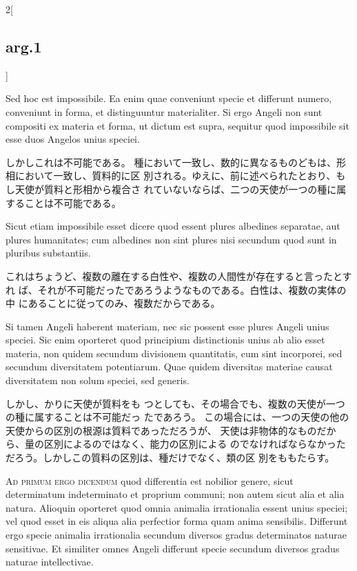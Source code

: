 \documentclass[paper=a4paper,fontsize=10pt,jafontsize=9pt,titlepage]{jlreq}
\begin{document}
\begin{paracol}{2}[\subsection{arg.1}]
\switchcolumn*

Sed hoc est
impossibile. 
Ea enim quae conveniunt specie et differunt numero,
conveniunt in forma, et distinguuntur materialiter. Si ergo Angeli non
sunt compositi ex materia et forma, ut dictum est supra, sequitur quod
impossibile sit esse duos Angelos unius speciei.

\switchcolumn

しかしこれは不可能である。
種において一致し、数的に異なるものどもは、形相において一致し、質料的に区
 別される。ゆえに、前に述べられたとおり、もし天使が質料と形相から複合さ
 れていないならば、二つの天使が一つの種に属することは不可能である。

\switchcolumn*

Sicut etiam impossibile
esset dicere quod essent plures albedines separatae, aut plures
humanitates; cum albedines non sint plures nisi secundum quod sunt in
pluribus substantiis.

\switchcolumn

これはちょうど、複数の離在する白性や、複数の人間性が存在すると言ったとすれ
 ば、それが不可能だったであろうようなものである。白性は、複数の実体の中
 にあることに従ってのみ、複数だからである。

\switchcolumn*

Si tamen Angeli haberent materiam, nec sic possent
esse plures Angeli unius speciei. 
Sic enim oporteret quod principium
distinctionis unius ab alio esset materia, non quidem secundum
divisionem quantitatis, cum sint incorporei, sed secundum diversitatem
potentiarum. Quae quidem diversitas materiae causat diversitatem non
solum speciei, sed generis.

\switchcolumn

しかし、かりに天使が質料をも
 つとしても、その場合でも、複数の天使が一つの種に属することは不可能だっ
 たであろう。
この場合には、一つの天使の他の天使からの区別の根源は質料であっただろうが、
 天使は非物体的なものだから、量の区別によるのではなく、能力の区別による
 のでなければならなかっただろう。しかしこの質料の区別は、種だけでなく、類の区
 別をももたらす。

\switchcolumn*[\subsection{ad.1}]

{\scshape Ad primum ergo dicendum} quod differentia est
nobilior genere, sicut determinatum indeterminato et proprium communi;
non autem sicut alia et alia natura. Alioquin oporteret quod omnia
animalia irrationalia essent unius speciei; vel quod esset in eis aliqua
alia perfectior forma quam anima sensibilis. Differunt ergo specie
animalia irrationalia secundum diversos gradus determinatos naturae
sensitivae. Et similiter omnes Angeli differunt specie secundum diversos
gradus naturae intellectivae.


\end{paracol}
\end{document}
